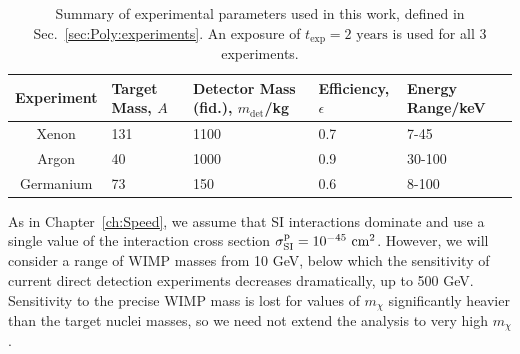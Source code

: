 \begin{table}[t]
  \setlength{\extrarowheight}{2pt}
  \begin{center}
	\begin{tabular}{c|m{1.2cm}m{2.2cm}m{2cm}m{2.1cm}}
        \hline\hline
	Experiment  & Target Mass, $A$ & Detector Mass (fid.), $m_\textrm{det}$/kg & Efficiency, $\epsilon$ & Energy Range/keV\\
	\hline
	Xenon  & 131  & 1100 \cite{Aprile:2012a} & 0.7 \cite{Aprile:2012b} & 7-45 \cite{Aprile:2010} \\
	Argon  & 40  & 1000 & 0.9 \cite{Benetti:2007} & 30-100 \cite{Grandi:2005} \\
        Germanium  & 73  & 150 \cite{Bauer:2013b} & 0.6 \cite{Bauer:2013a} & 8-100 \cite{Bauer:2013a} \\
        \hline\hline
	\end{tabular}
  \end{center}
\caption[Parameter values for the mock experiments used in Chapter \ref{ch:Poly}]{Summary of experimental parameters used in this work, defined in Sec.~\ref{sec:Poly:experiments}. An exposure of $t_\textrm{exp} = 2 \textrm{ years}$ is used for all 3 experiments.}
\label{tab:Poly:experiments}
\end{table}



As in Chapter~\ref{ch:Speed}, we assume that SI interactions dominate and use a single value of the interaction cross section $\sigmapsi = 10^{-45} \cmsq$. However, we will consider a range of WIMP masses from 10 GeV, below which the sensitivity of current direct detection experiments decreases dramatically, up to 500 GeV. Sensitivity to the precise WIMP mass is lost for values of $m_\chi$ significantly heavier than the target nuclei masses, so we need not extend the analysis to very high $m_\chi$.

